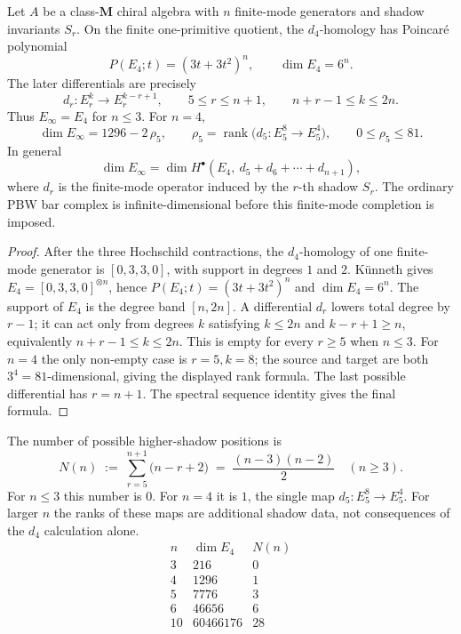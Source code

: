 \begin{proposition}[Class $\mathbf{M}$ bar growth past \texorpdfstring{$n = 3$}{n = 3}]
\label{prop:e3-bar-class-m-asymptotic}
Let $A$ be a class-$\mathbf{M}$ chiral algebra with $n$ finite-mode generators and shadow invariants \(S_r\). On the finite one-primitive quotient, the \(d_4\)-homology has Poincar\'e polynomial
\[
 P(E_4;t)=(3t+3t^2)^n,
 \qquad
 \dim E_4=6^n .
\]
The later differentials are precisely
\[
 d_r:E_r^k\longrightarrow E_r^{k-r+1},
 \qquad 5\leq r\leq n+1,\qquad n+r-1\leq k\leq 2n.
\]
Thus \(E_\infty=E_4\) for \(n\leq3\). For \(n=4\),
\[
 \dim E_\infty=1296-2\,\rho_5,
 \qquad
 \rho_5=\operatorname{rank}\!\bigl(d_5:E_5^8\to E_5^4\bigr),
 \qquad
 0\leq\rho_5\leq81 .
\]
In general
\[
 \dim E_\infty
 =
 \dim H^\bullet\!\left(E_4,\ d_5+d_6+\cdots+d_{n+1}\right),
\]
where \(d_r\) is the finite-mode operator induced by the \(r\)-th shadow \(S_r\).
The ordinary PBW bar complex is infinite-dimensional before this finite-mode completion is imposed.
\end{proposition}

\begin{proof}
After the three Hochschild contractions, the \(d_4\)-homology of one finite-mode generator is \([0,3,3,0]\), with support in degrees \(1\) and \(2\). K\"unneth gives \(E_4=[0,3,3,0]^{\otimes n}\), hence \(P(E_4;t)=(3t+3t^2)^n\) and \(\dim E_4=6^n\). The support of \(E_4\) is the degree band \([n,2n]\). A differential \(d_r\) lowers total degree by \(r-1\); it can act only from degrees \(k\) satisfying \(k\leq2n\) and \(k-r+1\geq n\), equivalently \(n+r-1\leq k\leq2n\). This is empty for every \(r\geq5\) when \(n\leq3\). For \(n=4\) the only non-empty case is \(r=5,k=8\); the source and target are both \(3^4=81\)-dimensional, giving the displayed rank formula. The last possible differential has \(r=n+1\). The spectral sequence identity gives the final formula.
\end{proof}

\begin{remark}
\label{rem:e3-bar-class-m-admissible-instances}
The number of possible higher-shadow positions is
\[
 N(n) \;:=\; \sum_{r = 5}^{n+1} \bigl(n - r + 2\bigr) \;=\; \frac{(n-3)(n-2)}{2} \quad (n \geq 3).
\]
For \(n\leq3\) this number is \(0\). For \(n=4\) it is \(1\), the single map \(d_5:E_5^8\to E_5^4\). For larger \(n\) the ranks of these maps are additional shadow data, not consequences of the \(d_4\) calculation alone.
\[
\begin{array}{c|c|c}
n & \dim E_4 & N(n)\\
\hline
3 & 216 & 0\\
4 & 1296 & 1\\
5 & 7776 & 3\\
6 & 46656 & 6\\
10 & 60466176 & 28
\end{array}
\]
\end{remark}

